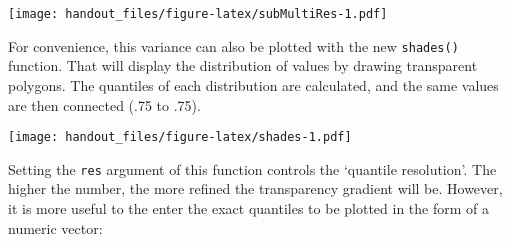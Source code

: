 \documentclass[]{article}
\newenvironment{Shaded}{\begin{snugshade}}{\end{snugshade}}
\newcommand{\DataTypeTok}[1]{\textcolor[rgb]{0.13,0.29,0.53}{#1}}
\newcommand{\DecValTok}[1]{\textcolor[rgb]{0.00,0.00,0.81}{#1}}
\newcommand{\FloatTok}[1]{\textcolor[rgb]{0.00,0.00,0.81}{#1}}
\newcommand{\KeywordTok}[1]{\textcolor[rgb]{0.13,0.29,0.53}{\textbf{#1}}}
\newcommand{\NormalTok}[1]{#1}
\newcommand{\OperatorTok}[1]{\textcolor[rgb]{0.81,0.36,0.00}{\textbf{#1}}}
\newcommand{\StringTok}[1]{\textcolor[rgb]{0.31,0.60,0.02}{#1}}
\begin{document}
\texttt{[image: handout\_files/figure-latex/subMultiRes-1.pdf]}

For convenience, this variance can also be plotted with the new
\texttt{shades()} function. That will display the distribution of values
by drawing transparent polygons. The quantiles of each distribution are
calculated, and the same values are then connected (.75 to .75).

\begin{Shaded}
\end{Shaded}

\texttt{[image: handout\_files/figure-latex/shades-1.pdf]}

Setting the \texttt{res} argument of this function controls the
`quantile resolution'. The higher the number, the more refined the
transparency gradient will be. However, it is more useful to the enter
the exact quantiles to be plotted in the form of a numeric vector:

\begin{Shaded}
\end{Shaded}
\end{document}

